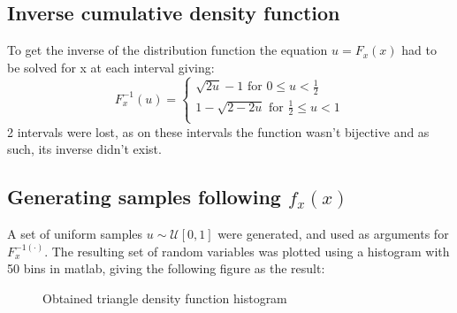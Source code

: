 \subsection{Inverse cumulative density function}
To get the inverse of the distribution function the equation $u = F_x(x)$ had to be solved for x at each interval giving:
\begin{equation}
   F_x^{-1}(u) = \begin{cases}
       \sqrt{2u} - 1 \text{ for }  0 \le u < \frac{1}{2}\\
       1 - \sqrt{2-2u}\text{ for } \frac{1}{2} \le u < 1\\
    \end{cases}
\end{equation}
2 intervals were lost, as on these intervals the function wasn't bijective and as such, its inverse didn't exist.

\begin{center}
\end{center}

\subsection{Generating samples following $f_x(x)$}
A set of uniform samples $u\sim \mathcal{U}[0,1]$ were generated, and used as arguments for $F_x^{-1(\cdot)}$. The resulting set of random variables was plotted using a histogram with 50 bins in matlab, giving the following figure as the result:

\begin{figure}[h!]
    \begin{center}
    \caption{Obtained triangle density function histogram}
    \end{center}
\end{figure}



